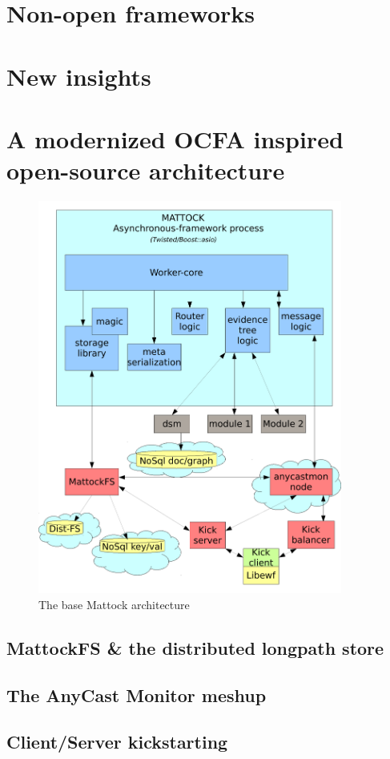 \section{Non-open frameworks}
\section{New insights}
\section{A modernized OCFA inspired open-source architecture}
\begin{figure}
\centering
\includegraphics[width=100mm]{mattock/libraryviewmattock.pdf}
\caption{The base Mattock architecture}
\label{fig:FlowInOut}
\end{figure}
\subsection{MattockFS \& the distributed longpath store}
\subsection{The AnyCast Monitor meshup}
\subsection{Client/Server kickstarting}
